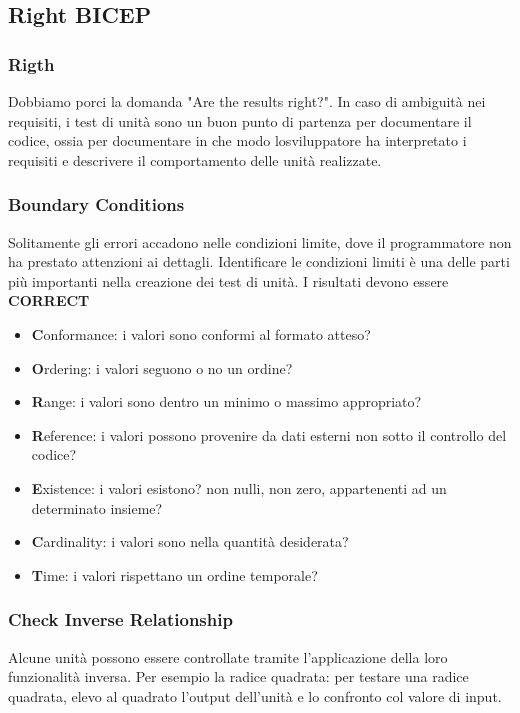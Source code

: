 \subsection{Right BICEP}

\subsubsection{Rigth}
Dobbiamo porci la domanda "Are the results right?". In caso di ambiguità nei requisiti, i test di unità sono un buon punto di partenza per documentare il codice, ossia per documentare in che modo losviluppatore ha interpretato i requisiti e descrivere il comportamento delle unità realizzate.

\subsubsection{Boundary Conditions}
Solitamente gli errori accadono nelle condizioni limite, dove il programmatore non ha prestato attenzioni ai dettagli.
Identificare le condizioni limiti è una delle parti più importanti nella creazione dei test di unità.
I risultati devono essere \textbf{CORRECT}
\begin{itemize}
    \item \textbf{C}onformance: i valori sono conformi al formato atteso?
    \item \textbf{O}rdering: i valori seguono o no un ordine?
    \item \textbf{R}ange: i valori sono dentro un minimo o massimo appropriato?
    \item \textbf{R}eference: i valori possono provenire da dati esterni non sotto il controllo del codice?
    \item \textbf{E}xistence: i valori esistono? non nulli, non zero, appartenenti ad un determinato insieme?
    \item \textbf{C}ardinality: i valori sono nella quantità desiderata?
    \item \textbf{T}ime: i valori rispettano un ordine temporale?
\end{itemize}

\subsubsection{Check Inverse Relationship}
Alcune unità possono essere controllate tramite l'applicazione della loro funzionalità inversa.
Per esempio la radice quadrata: per testare una radice quadrata, elevo al quadrato l'output dell'unità e lo confronto col valore di input.


